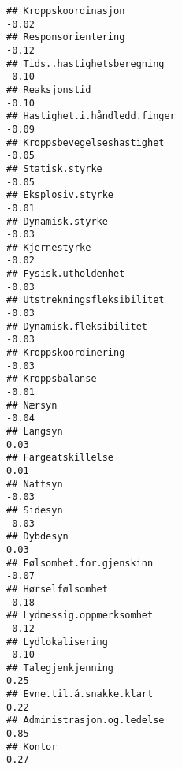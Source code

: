 \documentclass[
]{article}
\begin{document}
\begin{verbatim}
## Kroppskoordinasjon                                                               -0.02
## Responsorientering                                                               -0.12
## Tids..hastighetsberegning                                                        -0.10
## Reaksjonstid                                                                     -0.10
## Hastighet.i.håndledd.finger                                                      -0.09
## Kroppsbevegelseshastighet                                                        -0.05
## Statisk.styrke                                                                   -0.05
## Eksplosiv.styrke                                                                 -0.01
## Dynamisk.styrke                                                                  -0.03
## Kjernestyrke                                                                     -0.02
## Fysisk.utholdenhet                                                               -0.03
## Utstrekningsfleksibilitet                                                        -0.03
## Dynamisk.fleksibilitet                                                           -0.03
## Kroppskoordinering                                                               -0.03
## Kroppsbalanse                                                                    -0.01
## Nærsyn                                                                           -0.04
## Langsyn                                                                           0.03
## Fargeatskillelse                                                                  0.01
## Nattsyn                                                                          -0.03
## Sidesyn                                                                          -0.03
## Dybdesyn                                                                          0.03
## Følsomhet.for.gjenskinn                                                          -0.07
## Hørselfølsomhet                                                                  -0.18
## Lydmessig.oppmerksomhet                                                          -0.12
## Lydlokalisering                                                                  -0.10
## Talegjenkjenning                                                                  0.25
## Evne.til.å.snakke.klart                                                           0.22
## Administrasjon.og.ledelse                                                         0.85
## Kontor                                                                            0.27

\end{verbatim}
\end{document}
